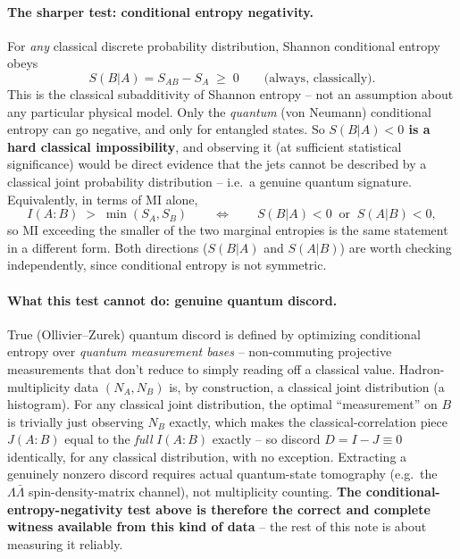 \documentclass[11pt]{article}
\newcommand{\SBA}{S(B|A)}
\begin{document}
\paragraph{The sharper test: conditional entropy negativity.} For
\emph{any} classical discrete probability distribution, Shannon
conditional entropy obeys
\begin{equation}
\SBA = S_{AB}-S_A \;\geq\; 0 \qquad \text{(always, classically).}
\end{equation}
This is the classical subadditivity of Shannon entropy -- not an
assumption about any particular physical model. Only the \emph{quantum}
(von Neumann) conditional entropy can go negative, and only for entangled
states. So \textbf{$\SBA<0$ is a hard classical impossibility}, and
observing it (at sufficient statistical significance) would be direct
evidence that the jets cannot be described by a classical joint
probability distribution -- i.e.\ a genuine quantum signature.
Equivalently, in terms of MI alone,
\begin{equation}
I(A{:}B) \;>\; \min(S_A,S_B)
\qquad\Longleftrightarrow\qquad
\SBA<0 \ \text{ or }\ S(A|B)<0,
\end{equation}
so MI exceeding the smaller of the two marginal entropies is the same
statement in a different form. Both directions ($\SBA$ and $S(A|B)$) are
worth checking independently, since conditional entropy is not symmetric.

\paragraph{What this test cannot do: genuine quantum discord.} True
(Ollivier--Zurek) quantum discord is defined by optimizing conditional
entropy over \emph{quantum measurement bases} -- non-commuting projective
measurements that don't reduce to simply reading off a classical value.
Hadron-multiplicity data $(N_A,N_B)$ is, by construction, a classical
joint distribution (a histogram). For any classical joint distribution,
the optimal ``measurement'' on $B$ is trivially just observing $N_B$
exactly, which makes the classical-correlation piece $J(A{:}B)$ equal to
the \emph{full} $I(A{:}B)$ exactly -- so discord $D=I-J\equiv 0$
identically, for any classical distribution, with no exception. Extracting
a genuinely nonzero discord requires actual quantum-state tomography
(e.g.\ the $\Lambda\bar\Lambda$ spin-density-matrix channel), not
multiplicity counting. \textbf{The conditional-entropy-negativity test
above is therefore the correct and complete witness available from this
kind of data} -- the rest of this note is about measuring it reliably.
\end{document}
